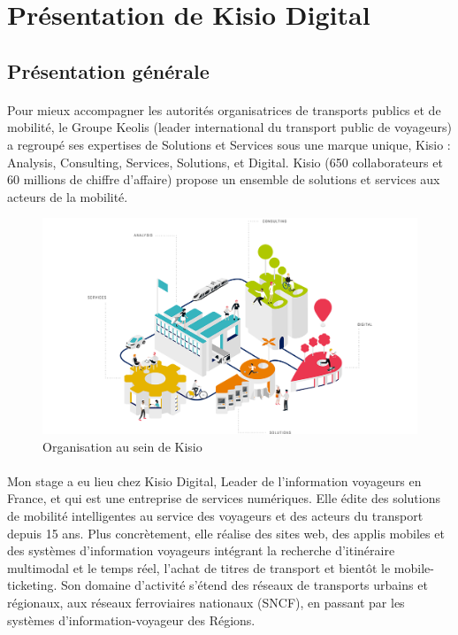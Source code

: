 \documentclass[a4paper]{report}
\begin{document}
\section{Présentation de Kisio Digital}
\subsection{Présentation générale}
			
\paragraph{} Pour mieux accompagner les autorités organisatrices de transports publics et de mobilité, le Groupe Keolis (leader  international du transport public de voyageurs) a regroupé ses expertises de Solutions et Services sous une marque unique, Kisio : Analysis, Consulting, Services, Solutions, et Digital. Kisio (650 collaborateurs et 60 millions de chiffre d'affaire) propose un ensemble de solutions et services aux acteurs de la mobilité.

\begin{figure}[H] 
	\begin{center}
		\includegraphics[width=500pt]{image/orga_kisio}
		\caption{Organisation au sein de Kisio}
		\label{Organisation au sein de Kisio}
	\end{center}
\end{figure}

\paragraph{} Mon stage a eu lieu chez Kisio Digital, Leader de l'information voyageurs en France, et qui est une entreprise de services numériques. Elle édite des solutions de mobilité intelligentes au service des voyageurs et des acteurs du transport depuis 15 ans. Plus concrètement, elle réalise  des sites web, des applis mobiles et des systèmes d’information voyageurs intégrant la recherche d’itinéraire multimodal et le temps réel, l’achat de titres de transport et bientôt le mobile-ticketing. Son domaine d’activité s’étend des réseaux de transports urbains et régionaux, aux réseaux ferroviaires nationaux (SNCF), en passant par les systèmes d’information-voyageur des Régions. 
				
\end{document}
